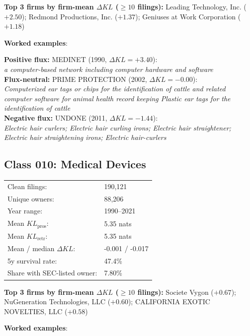 \textbf{Top 3 firms by firm-mean $\Delta KL$ ($\geq 10$ filings):} Leading Technology, Inc. ($+2.50$); Redmond Productions, Inc. ($+1.37$); Geniuses at Work Corporation ($+1.18$)

\textbf{Worked examples}:

  \textbf{Positive flux:} \textsc{MEDINET} (1990, $\Delta KL=+3.40$):\\
  \textit{a computer-based network including computer hardware and software}\\
  \textbf{Flux-neutral:} \textsc{PRIME PROTECTION} (2002, $\Delta KL=-0.00$):\\
  \textit{Computerized ear tags or chips for the identification of cattle and related computer software for animal health record keeping Plastic ear tags for the identification of cattle}\\
  \textbf{Negative flux:} \textsc{UNDONE} (2011, $\Delta KL=-1.44$):\\
  \textit{Electric hair curlers; Electric hair curling irons; Electric hair straightener; Electric hair straightening irons; Electric hair-curlers}\\

\subsection*{Class 010: Medical Devices}
\label{app:industry-010}

\begin{tabular}{ll}
Clean filings: & 190,121 \\
Unique owners: & 88,206 \\
Year range: & 1990--2021 \\
Mean $KL_\text{pros}$: & 5.35 nats \\
Mean $KL_\text{retr}$: & 5.35 nats \\
Mean / median $\Delta KL$: & -0.001 / -0.017 \\
5y survival rate: & 47.4\% \\
Share with SEC-listed owner: & 7.80\% \\
\end{tabular}

\textbf{Top 3 firms by firm-mean $\Delta KL$ ($\geq 10$ filings):} Societe Vygon ($+0.67$); NuGeneration Technologies, LLC ($+0.60$); CALIFORNIA EXOTIC NOVELTIES, LLC ($+0.58$)

\textbf{Worked examples}:

